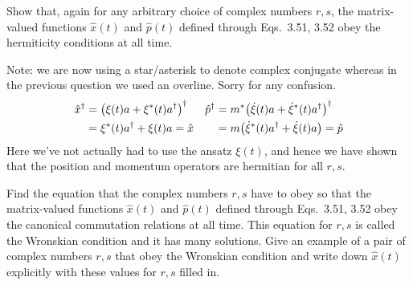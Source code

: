 \documentclass[boxes,pages]{homework}
\makeatletter
\numberwithin{@problem}{section}
\makeatother
\begin{document}
\begin{problem}
Show that, again for any arbitrary choice of complex numbers $r, s$, the matrix-valued functions $\hat{x}(t)$ and $\hat{p}(t)$ defined through Eqs.\ 3.51, 3.52 obey the hermiticity conditions at all time.
\end{problem}

\begin{solution}
	Note: we are now using a star/asterisk to denote complex conjugate whereas in the previous question we used an overline. Sorry for any confusion.
	\begin{align*}
		\hat{x}^\dagger & = \qty(\xi(t)a +\xi^*(t)a^\dagger)^\dagger & \hat{p}^\dagger & = m^*\qty(\dot{\xi}(t)a + \dot{\xi}^*(t)a^\dagger)^\dagger \\
		                & = \xi^*(t)a^\dagger + \xi(t)a = \hat{x}    &                 & = m\qty(\dot{\xi}^*(t)a^\dagger + \dot{\xi}(t)a) = \hat{p}
	\end{align*}
	Here we've not actually had to use the ansatz $\xi(t)$, and hence we have shown that the position and momentum operators are hermitian for all $r, s$.
\end{solution}

\begin{problem}
Find the equation that the complex numbers $r, s$ have to obey so that the matrix-valued functions $\hat{x}(t)$ and $\hat{p}(t)$ defined through Eqs.\ 3.51, 3.52 obey the canonical commutation relations at all time. This equation for $r, s$ is called the Wronskian condition and it has many solutions. Give an example of a pair of complex numbers $r, s$ that obey the Wronskian condition and write down $\hat{x}(t)$ explicitly with these values for $r, s$ filled in.
\end{problem}
\end{document}
